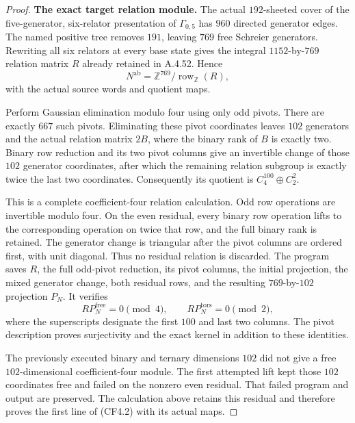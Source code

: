 \begin{proof}
\par\medskip\noindent\textbf{The exact target relation module.}\quad
The actual $192$-sheeted cover of the five-generator, six-relator
presentation of $\Gamma_{0,5}$ has $960$ directed generator edges.
The named positive tree removes $191$, leaving $769$ free
Schreier generators.  Rewriting all six relators at every base
state gives the integral $1152$-by-$769$ relation matrix $R$
already retained in A.4.52.  Hence
\[
 N^{\mathrm{ab}}=\mathbb Z^{769}/\operatorname{row}_{\mathbb Z}(R),
                                                               \tag{CF4.6}
\]
with the actual source words and quotient maps.

Perform Gaussian elimination modulo four using only odd pivots.
There are exactly $667$ such pivots.  Eliminating these pivot
coordinates leaves $102$ generators and the actual relation
matrix $2B$, where the binary rank of $B$ is exactly two.
Binary row reduction and its two pivot columns give an invertible
change of those $102$ generator coordinates, after which the
remaining relation subgroup is exactly twice the last two
coordinates.  Consequently its quotient is
$C_4^{100}\oplus C_2^2$.

This is a complete coefficient-four relation calculation.
Odd row operations are invertible modulo four.  On the even
residual, every binary row operation lifts to the corresponding
operation on twice that row, and the full binary rank is retained.
The generator change is triangular after the pivot columns are
ordered first, with unit diagonal.  Thus no residual relation is
discarded.  The program saves $R$, the full odd-pivot reduction,
its pivot columns, the initial projection, the mixed generator
change, both residual rows, and the resulting $769$-by-$102$
projection $P_N$.  It verifies
\[
       RP_N^{\mathrm{free}}=0\pmod4,\qquad
       RP_N^{\mathrm{tors}}=0\pmod2,
                                                               \tag{CF4.7}
\]
where the superscripts designate the first $100$ and last two
columns.  The pivot description proves surjectivity and the exact
kernel in addition to these identities.

The previously executed binary and ternary dimensions $102$ did
not give a free $102$-dimensional coefficient-four module.  The
first attempted lift kept those $102$ coordinates free and failed
on the nonzero even residual.  That failed program and output
are preserved.  The calculation above retains this residual and
therefore proves the first line of (CF4.2) with its actual maps.


\end{proof}
